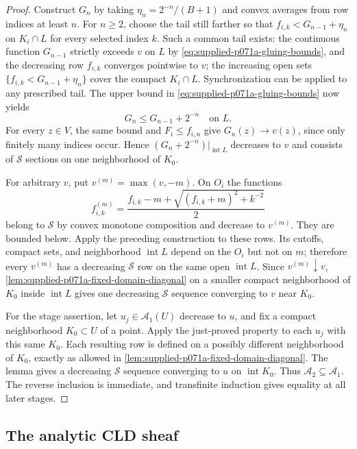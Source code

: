 \begin{proof}
Construct $G_n$ by taking $\eta_n=2^{-n}/(B+1)$ and convex averages from row indices at least $n$. For $n\geq2$, choose the tail still farther so that $f_{i,k}<G_{n-1}+\eta_n$ on $K_i\cap L$ for every selected index $k$. Such a common tail exists: the continuous function $G_{n-1}$ strictly exceeds $v$ on $L$ by \eqref{eq:supplied-p071a-gluing-bounds}, and the decreasing row $f_{i,k}$ converges pointwise to $v$; the increasing open sets $\{f_{i,k}<G_{n-1}+\eta_n\}$ cover the compact $K_i\cap L$. Synchronization can be applied to any prescribed tail. The upper bound in \eqref{eq:supplied-p071a-gluing-bounds} now yields
\[
G_n\leq G_{n-1}+2^{-n}\quad\text{on }L.
\]
For every $z\in V$, the same bound and $F_i\leq f_{i,n}$ give $G_n(z)\to v(z)$, since only finitely many indices occur. Hence $(G_n+2^{-n})|_{\operatorname{int}L}$ decreases to $v$ and consists of $\mathscr{S}$ sections on one neighborhood of $K_0$.

For arbitrary $v$, put $v^{(m)}=\max(v,-m)$. On $O_i$ the functions
\[
f_{i,k}^{(m)}=\frac{f_{i,k}-m+\sqrt{(f_{i,k}+m)^2+k^{-2}}}{2}
\]
belong to $\mathscr{S}$ by convex monotone composition and decrease to $v^{(m)}$. They are bounded below. Apply the preceding construction to these rows. Its cutoffs, compact sets, and neighborhood $\operatorname{int}L$ depend on the $O_i$ but not on $m$; therefore every $v^{(m)}$ has a decreasing $\mathscr{S}$ row on the same open $\operatorname{int}L$. Since $v^{(m)}\downarrow v$, \cref{lem:supplied-p071a-fixed-domain-diagonal} on a smaller compact neighborhood of $K_0$ inside $\operatorname{int}L$ gives one decreasing $\mathscr{S}$ sequence converging to $v$ near $K_0$.

For the stage assertion, let $u_j\in\mathscr{A}_1(U)$ decrease to $u$, and fix a compact neighborhood $K_0\subset U$ of a point. Apply the just-proved property to each $u_j$ with this same $K_0$. Each resulting row is defined on a possibly different neighborhood of $K_0$, exactly as allowed in \cref{lem:supplied-p071a-fixed-domain-diagonal}. The lemma gives a decreasing $\mathscr{S}$ sequence converging to $u$ on $\operatorname{int}K_0$. Thus $\mathscr{A}_2\subseteq\mathscr{A}_1$. The reverse inclusion is immediate, and transfinite induction gives equality at all later stages.
\end{proof}

\subsection{The analytic CLD sheaf}
\label{sec:supplied-p071a-cld-sheaf}

